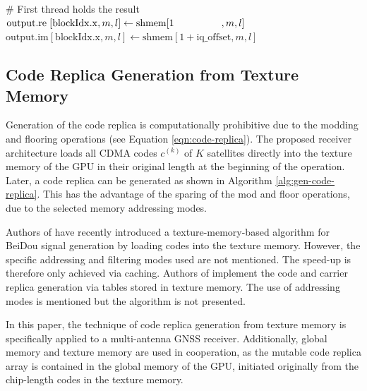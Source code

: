 \documentclass{juliacon}
\begin{document}
\begin{algorithm}[h]
\begin{algorithmic}[1]
                \vspace{4mm}
                \State \# First thread holds the result
                    \State $\mathrm{output.re}\hspace{0.3em}[\mathrm{blockIdx.x}, m, l] \gets \mathrm{shmem}[1 \hspace{4.8em}, m, l]$
                    \State $\mathrm{output.im}[\mathrm{blockIdx.x}, m, l] \gets \mathrm{shmem}[1 + \mathrm{iq\_offset}, m, l]$
                \EndIf
            \EndFor
        \EndProcedure
    \end{algorithmic}
\end{algorithm}

\subsection*{Code Replica Generation from Texture Memory}
Generation of the code replica is computationally prohibitive due to the modding and flooring operations (see Equation \ref{eqn:code-replica}). The proposed receiver architecture loads all CDMA codes $c^{(k)}$ of $K$ satellites directly into the texture memory of the GPU in their original length at the beginning of the operation. Later, a code replica can be generated as shown in Algorithm \ref{alg:gen-code-replica}. This has the advantage of the sparing of the mod and floor operations, due to the selected memory addressing modes.

Authors of \cite{Shi2021} have recently introduced a texture-memory-based algorithm for BeiDou signal generation by loading codes into the texture memory. However, the specific addressing and filtering modes used are not mentioned. The speed-up is therefore only achieved via caching. Authors of \cite{Li2012} implement the code and carrier replica generation via tables stored in texture memory. The use of addressing modes is mentioned but the algorithm is not presented.

In this paper, the technique of code replica generation from texture memory is specifically applied to a multi-antenna GNSS receiver. Additionally, global memory and texture memory are used in cooperation, as the mutable code replica array is contained in the global memory of the GPU, initiated originally from the chip-length codes in the texture memory. 
\end{document}
